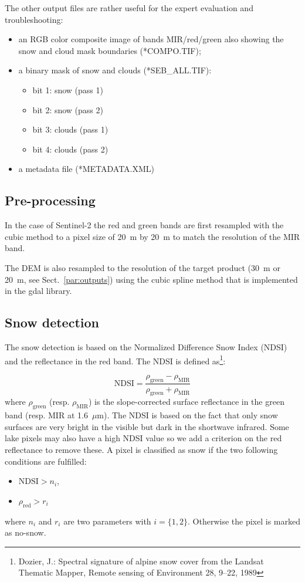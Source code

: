 \documentclass[a4paper]{article}
\begin{document}
The other output files are rather useful for the expert evaluation and troubleshooting:
\begin{itemize}
 \item an RGB color composite image of bands MIR/red/green also showing the snow and cloud mask boundaries (*COMPO.TIF);
 \item a binary mask of snow and clouds (*SEB\_ALL.TIF):
 \begin{itemize}
 \item bit 1: snow (pass 1)
 \item bit 2: snow (pass 2)
 \item bit 3: clouds (pass 1)
 \item bit 4: clouds (pass 2)
 \end{itemize}
 \item a metadata file (*METADATA.XML)
 
\end{itemize}

\subsection{Pre-processing}

In the case of Sentinel-2 the red and green bands are first resampled with the cubic method to a pixel size of 20~m by 20~m to match the resolution of the MIR band.

The DEM is also resampled to the resolution of the target product (30~m or 20~m, see Sect.~\ref{par:outputs}) using the cubic spline method that is implemented in the gdal library.

\subsection{Snow detection}\label{par:snowdetec}

The snow detection is based on the Normalized Difference Snow Index (NDSI) and the reflectance in the red band. The NDSI is defined as\footnote{Dozier, J.: Spectral signature of alpine snow cover from the Landsat Thematic Mapper, Remote sensing of Environment 28, 9–22, 1989}:

\begin{equation}
\mathrm{NDSI} = \frac{\rho_\mathrm{green}-\rho_\mathrm{MIR}}{\rho_\mathrm{green}+\rho_\mathrm{MIR}}
\end{equation}
where $\rho_\mathrm{green}$ (resp. $\rho_\mathrm{MIR}$) is the slope-corrected surface reflectance in the green band (resp. MIR at 1.6~$\mu$m). The NDSI is based on the fact that only snow surfaces are very bright in the visible but dark in the shortwave infrared. Some lake pixels may also have a high NDSI value so we add a criterion on the red reflectance to remove these. A pixel is classified as snow if the two following conditions are fulfilled:
\begin{itemize}
 \item $\mathrm{NDSI} > n_i$,
 \item $\rho_\mathrm{red} > r_i$
\end{itemize}
where $n_i$ and $r_i$ are two parameters with $i=\{1,2\}$. Otherwise the pixel is marked as no-snow. 
\end{document}
